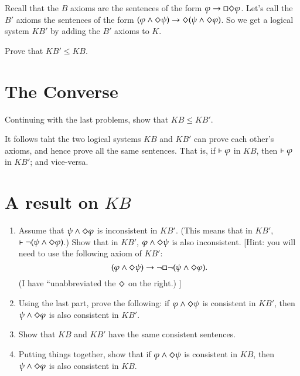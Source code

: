 \documentclass[12pt]{article}
\begin{document}
Recall that the $B$ axioms are the sentences of the form $\varphi\rightarrow \Box\Diamond\varphi$.
Let's call the $B'$ axioms the sentences of the form 
 $(\varphi\wedge \Diamond \psi) \rightarrow \Diamond(\psi\wedge\Diamond\varphi)$.
So we get a logical system $KB'$ by adding the $B'$ axioms to $K$.

Prove that $KB' \leq KB$.

\section{The Converse}
Continuing with the last problems, show that
 $KB \leq KB'$.
 
It follows taht the two logical systems  $KB$ and $KB'$
can prove each other's axioms,
and hence prove all the same sentences.
That is, if $\vdash\varphi$ in $KB$, then $\vdash\varphi$ in $KB'$; and vice-versa.


\section{A result on $KB$}

\begin{enumerate}
\item Assume that $\psi\wedge\Diamond\varphi$ is inconsistent in $KB'$.
(This means that in $KB'$, $\vdash \neg(\psi\wedge\Diamond\varphi)$.)
Show that in  $KB'$, $\varphi\wedge\Diamond\psi$ is also inconsistent.
[Hint: you will need to use the following axiom of $KB'$:
$$ (\varphi\wedge\Diamond\psi) \rightarrow \neg\Box\neg(\psi\wedge\Diamond\varphi).$$
(I have ``unabbreviated the $\Diamond$ on the right.) ]
\item Using the last part, prove the following:
if $\varphi\wedge\Diamond\psi$ is consistent in $KB'$, then $\psi\wedge\Diamond\varphi$ is also consistent in $KB'$.
\item Show that $KB$ and $KB'$ have the same consistent sentences.
\item Putting things together, show that 
if $\varphi\wedge\Diamond\psi$ is consistent in $KB$, then $\psi\wedge\Diamond\varphi$ is also consistent in $KB$.
\end{enumerate}
\end{document}

